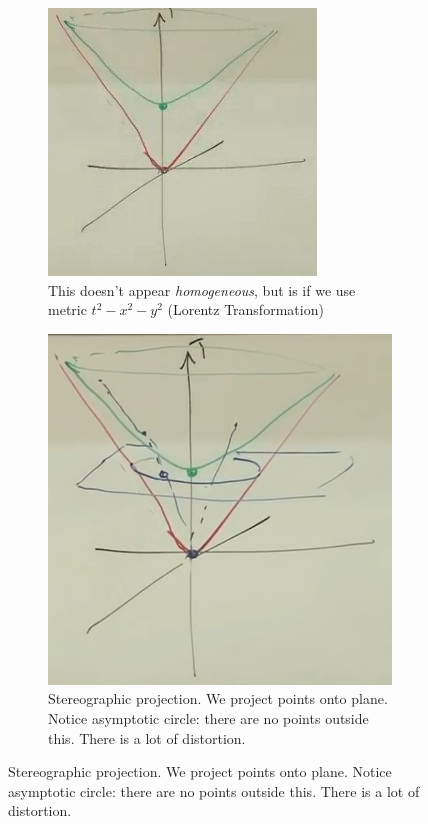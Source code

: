 \documentclass[]{article}
\begin{document}
\begin{figure}[H]
	\caption{Hyperboloid. }
	\begin{subfigure}[t]{0.3\textwidth}
		\caption{This doesn't appear \emph{homogeneous}, but is if we use metric $t^2-x^2-y^2$ (Lorentz Transformation)}
		\includegraphics[width=\textwidth]{cosmo-3-hyperboloid}
	\end{subfigure}
	\;
	\begin{subfigure}[t]{0.3\textwidth}
		\caption{Stereographic projection. We project points onto plane. Notice asymptotic circle: there are no points outside this. There is a lot of distortion.}
		\includegraphics[width=\textwidth]{cosmo-3-hyperboloid-stereographic}

\end{subfigure}
\end{figure}
\end{document}
